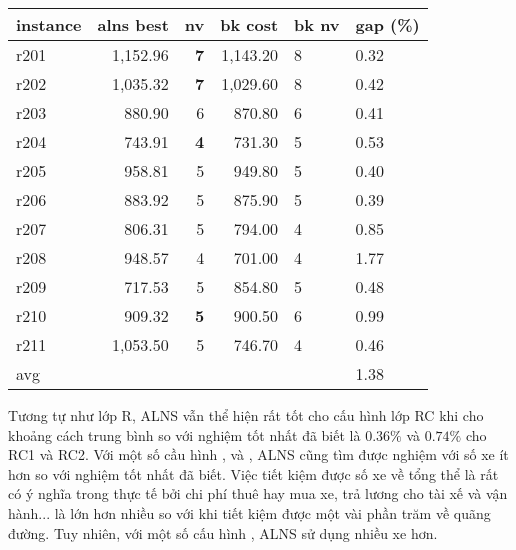   \begin{table}[caption={Kết quả đo với tập Solomon R2}, label=exp:solomonR2, placement=h]
    \small
    \centering
    \begin{tabular}{lrrrll}
    \hline
    instance & alns best & nv & bk cost & bk nv & gap (\%) \\ \hline
    r201 & 1,152.96 & \textbf{7} & 1,143.20 & 8 & 0.32 \\ \hline
    r202 & 1,035.32 & \textbf{7} & 1,029.60 & 8 & 0.42 \\ \hline
    r203 & 880.90 & 6 & 870.80 & 6 & 0.41 \\ \hline
    r204 & 743.91 & \textbf{4} & 731.30 & 5 & 0.53 \\ \hline
    r205 & 958.81 & 5 & 949.80 & 5 & 0.40 \\ \hline
    r206 & 883.92 & 5 & 875.90 & 5 & 0.39 \\ \hline
    r207 & 806.31 & 5 & 794.00 & 4 & 0.85 \\ \hline
    r208 & 948.57 & 4 & 701.00 & 4 & 1.77 \\ \hline
    r209 & 717.53 & 5 & 854.80 & 5 & 0.48 \\ \hline
    r210 & 909.32 & \textbf{5} & 900.50 & 6 & 0.99 \\ \hline
    r211 & 1,053.50 & 5 & 746.70 & 4 & 0.46 \\ \hline
    avg &  &  &  &  & 1.38 \\ \hline
    \end{tabular}
  \end{table}

  Tương tự như lớp R, ALNS vẫn thể hiện rất tốt cho cấu hình lớp RC khi cho khoảng cách trung bình so với nghiệm tốt nhất đã biết là $0.36\%$ và $0.74\%$ cho RC1 và RC2. Với một số cầu hình ,  và , ALNS cũng tìm được nghiệm với số xe ít hơn so với nghiệm tốt nhất đã biết. Việc tiết kiệm được số xe về tổng thể là rất có ý nghĩa trong thực tế  bởi chi phí thuê hay mua xe, trả lương cho tài xế và vận hành... là lớn hơn nhiều so với khi tiết kiệm được một vài phần trăm về quãng đường. Tuy nhiên, với một số cấu hình , ALNS sử dụng nhiều xe hơn.

